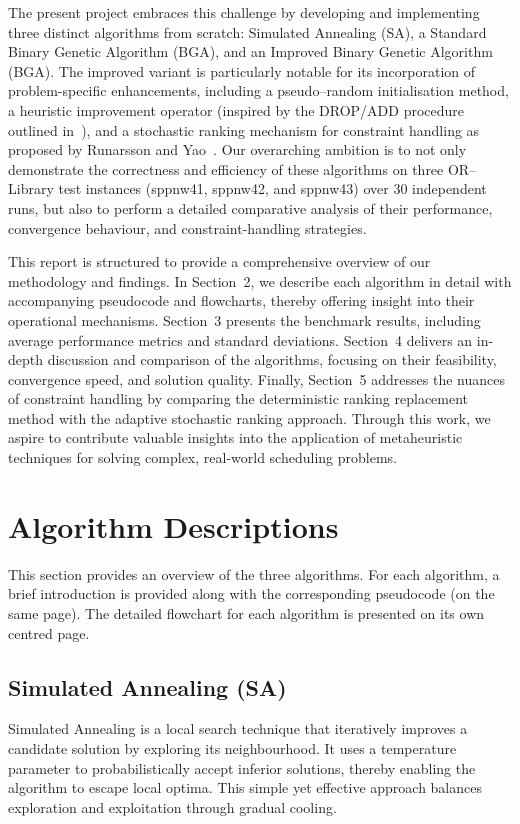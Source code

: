 \documentclass[12pt]{article}
\begin{document}
The present project embraces this challenge by developing and implementing three distinct algorithms from scratch: Simulated Annealing (SA), a Standard Binary Genetic Algorithm (BGA), and an Improved Binary Genetic Algorithm (BGA). The improved variant is particularly notable for its incorporation of problem-specific enhancements, including a pseudo–random initialisation method, a heuristic improvement operator (inspired by the DROP/ADD procedure outlined in~\cite{ChuAndBeasley1998}), and a stochastic ranking mechanism for constraint handling as proposed by Runarsson and Yao~\cite{RunarssonYao2000}. Our overarching ambition is to not only demonstrate the correctness and efficiency of these algorithms on three OR–Library test instances (sppnw41, sppnw42, and sppnw43) over 30 independent runs, but also to perform a detailed comparative analysis of their performance, convergence behaviour, and constraint-handling strategies.

This report is structured to provide a comprehensive overview of our methodology and findings. In Section~2, we describe each algorithm in detail with accompanying pseudocode and flowcharts, thereby offering insight into their operational mechanisms. Section~3 presents the benchmark results, including average performance metrics and standard deviations. Section~4 delivers an in-depth discussion and comparison of the algorithms, focusing on their feasibility, convergence speed, and solution quality. Finally, Section~5 addresses the nuances of constraint handling by comparing the deterministic ranking replacement method with the adaptive stochastic ranking approach. Through this work, we aspire to contribute valuable insights into the application of metaheuristic techniques for solving complex, real-world scheduling problems.

\section{Algorithm Descriptions}
\label{sec:algorithms}
This section provides an overview of the three algorithms. For each algorithm, a brief introduction is provided along with the corresponding pseudocode (on the same page). The detailed flowchart for each algorithm is presented on its own centred page.

\newpage

\subsection{Simulated Annealing (SA)}
Simulated Annealing is a local search technique that iteratively improves a candidate solution by exploring its neighbourhood. It uses a temperature parameter to probabilistically accept inferior solutions, thereby enabling the algorithm to escape local optima. This simple yet effective approach balances exploration and exploitation through gradual cooling.
\end{document}
